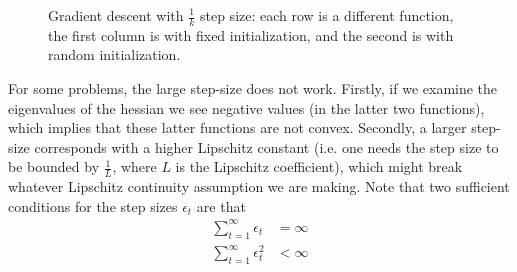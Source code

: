 \begin{figure}[h!tbp]
       \caption{Gradient descent with $\frac{1}{k}$ step size: each row is a different
       function, the first column is with fixed initialization, and the second is with 
       random initialization.}
\end{figure}

\newpage
For some problems, the large step-size does not work. Firstly, if we examine
the eigenvalues of the hessian we see negative values (in the latter two
functions), which implies that these latter functions are not convex. Secondly,
a larger step-size corresponds with a higher Lipschitz constant (i.e. one needs
the step size to be bounded by $\frac{1}{L}$, where $L$ is the Lipschitz
coefficient), which might break whatever Lipschitz continuity assumption we are
making. Note that two sufficient conditions for the step sizes $\epsilon_t$ are
that
\begin{align}
    \sum_{t=1}^{\infty} \epsilon_t  &= \infty \\
    \sum_{t=1}^{\infty} \epsilon_t^{2} &< \infty
\end{align}



